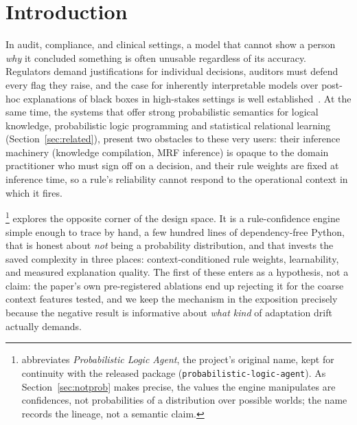 \section{Introduction}\label{sec:intro}

In audit, compliance, and clinical settings, a model that cannot show a
person \emph{why} it concluded something is often unusable regardless of
its accuracy. Regulators demand justifications for individual decisions,
auditors must defend every flag they raise, and the case for inherently
interpretable models over post-hoc explanations of black boxes in
high-stakes settings is well established~\cite{rudin2019,dimarino2025}. At the same
time, the systems that offer strong probabilistic semantics for logical
knowledge, probabilistic logic programming and statistical relational
learning (Section~\ref{sec:related}), present two obstacles to these
very users: their inference machinery (knowledge compilation, MRF
inference) is opaque to the domain practitioner who must sign off on a
decision, and their rule weights are fixed at inference time, so a rule's
reliability cannot respond to the operational context in which it fires.

\pla{}\footnote{\pla{} abbreviates \emph{Probabilistic Logic Agent},
the project's original name, kept for continuity with the released
package (\texttt{probabilistic-logic-agent}). As
Section~\ref{sec:notprob} makes precise, the values the engine
manipulates are confidences, not probabilities of a distribution over
possible worlds; the name records the lineage, not a semantic claim.}
explores the opposite corner of the design space. It is a
rule-confidence engine simple enough to trace by hand, a few hundred
lines of dependency-free Python, that is honest about \emph{not} being
a probability distribution, and that invests the saved complexity in
three places: context-conditioned rule weights, learnability, and
measured explanation quality. The first of these enters as a
hypothesis, not a claim: the paper's own pre-registered ablations end
up rejecting it for the coarse context features tested, and we keep the
mechanism in the exposition precisely because the negative result is
informative about \emph{what kind} of adaptation drift actually
demands.

